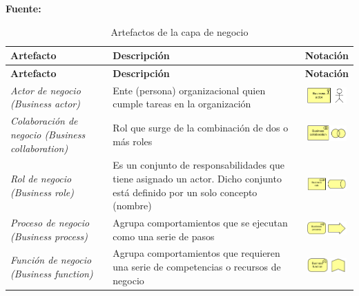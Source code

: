  \begin{center}
 
 	\textbf{Fuente:} \cite{archimate2}
 	
	\begin{longtable}{|p{4cm}|p{6cm}|c|}
	\caption{Artefactos de la capa de negocio \label{tab:artefactos_capa_negocio}} \\
	\hline
    \textbf{Artefacto} & 
    \textbf{Descripción} & 
    \textbf{Notación} \\ 
    \hline
	\endfirsthead
    \hline
    \textbf{Artefacto} & 
    \textbf{Descripción} & 
    \textbf{Notación} \\ 
    \hline
	\endhead
    \hline
	\endfoot
	\hline
	\endlastfoot
    \hline
    \textit{Actor de negocio (Business actor)} & 
    Ente (persona) organizacional quien cumple tareas en la organización &  
    \includegraphics[width=1.5cm]{./imagenes/Archimate/artefactos/businessactor.png}\\
	\hline
	\textit{Colaboración de negocio (Business collaboration)} & 
    Rol que surge de la combinación de dos o más roles &  
    \includegraphics[width=1.5cm]{./imagenes/Archimate/artefactos/businesscollaboration.png}\\
	\hline    
    \textit{Rol de negocio (Business role)} & 
    Es un conjunto de responsabilidades que tiene asignado un actor. Dicho conjunto está definido por un solo concepto (nombre) &  
    \includegraphics[width=1.5cm]{./imagenes/Archimate/artefactos/businessrole.png}\\
    \hline
    \textit{Proceso de negocio (Business process)} & 
    Agrupa comportamientos que se ejecutan como una serie de pasos &  
    \includegraphics[width=1.5cm]{./imagenes/Archimate/artefactos/businessprocess.png}\\
	\hline
	\textit{Función de negocio (Business function)} & 
    Agrupa comportamientos que requieren una serie de competencias o recursos de negocio &  
    \includegraphics[width=1.5cm]{./imagenes/Archimate/artefactos/businessfunction.png}\\

\end{longtable}
\end{center}

